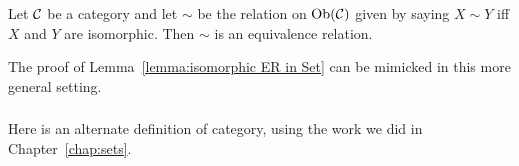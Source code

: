 \documentclass[../main/CT4S-EN-RU]{subfiles}
\begin{document}
\begin{exerciseRUS}
\end{exerciseRUS}

\begin{lemmaENG}\label{lemma:isomorphic ER}
Let $\mathcal{C}$ be a category and let $\sim$ be the relation on $\operatorname{Ob}(\mathcal{C})$ given by saying $X\sim Y$ iff $X$ and $Y$ are isomorphic. Then $\sim$ is an equivalence relation.
\end{lemmaENG}

\begin{lemmaRUS}\label{lemma:isomorphic ER}
\end{lemmaRUS}

\begin{proofENG}
The proof of Lemma~\ref{lemma:isomorphic ER in Set} can be mimicked in this more general setting.
\end{proofENG}

\begin{proofRUS}
\end{proofRUS}


\subsubsection{}

\begin{blockENG}
Here is an alternate definition of category, using the work we did in Chapter~\ref{chap:sets}.
\end{blockENG}

\begin{blockRUS}
\end{blockRUS}
\end{document}
